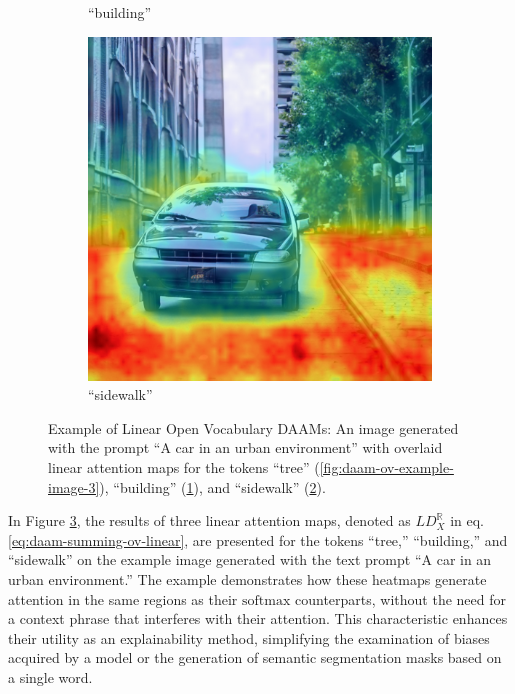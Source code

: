 \begin{figure}
\begin{subfigure}{0.30\columnwidth}
   \caption{``building''}
   \label{fig:daam-ov-example-image-4}
  \end{subfigure}
  \begin{subfigure}{0.30\columnwidth}
   \includegraphics[width=\columnwidth]{img/3-methodology/example_ov_daam_heatmap_sidewalk_without_context.png}
   \caption{``sidewalk''}
   \label{fig:daam-ov-example-image-5}
  \end{subfigure}
  \caption[Example of Linear Open Vocabulary DAAMs]{Example of Linear Open Vocabulary DAAMs: An image generated
with the prompt ``A car in an urban environment'' with overlaid linear attention maps for the
tokens ``tree'' (\ref{fig:daam-ov-example-image-3}), ``building'' (\ref{fig:daam-ov-example-image-4}), and ``sidewalk'' (\ref{fig:daam-ov-example-image-5}).}
  \label{fig:daam-ov-example-linear}
  \end{figure}

In Figure \ref{fig:daam-ov-example-linear}, the results of three linear attention maps, denoted as ${LD}_{X}^{\mathbb{R}}$ in eq. \ref{eq:daam-summing-ov-linear}, are presented for the tokens ``tree,'' ``building,'' and ``sidewalk'' on the example image generated with the text prompt ``A car in an urban environment.'' The example demonstrates how these heatmaps generate attention in the same regions as their $\text{softmax}$ counterparts, without the need for a context phrase that interferes with their attention. This characteristic enhances their utility as an explainability method, simplifying the examination of biases acquired by a model or the generation of semantic segmentation masks based on a single word.

